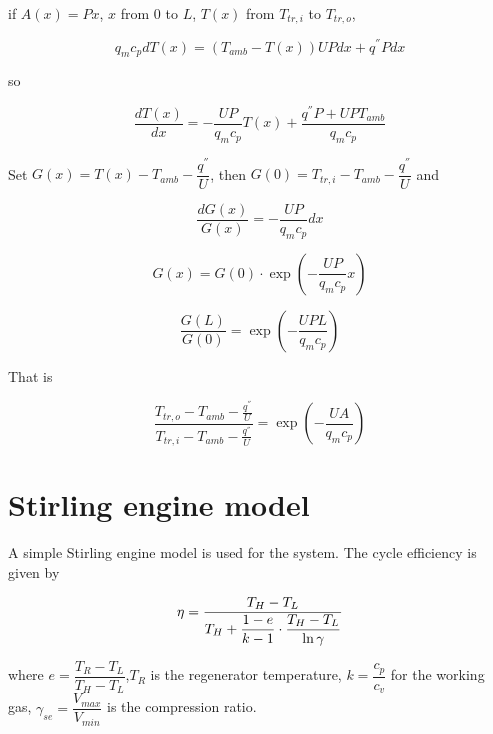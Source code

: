 \documentclass{article}
\begin{document}
if $A(x)=Px$, $x$ from $0$ to $L$, $T(x)$ from $T_{tr,i}$ to $T_{tr,o}$,

\begin{equation*}
	q_{m}c_{p}dT(x)=(T_{amb}-T(x))UPdx+q^{''}Pdx
\end{equation*}

so

\begin{equation*}
	\frac{dT(x)}{dx}=-\frac{UP}{q_{m}c_{p}}T(x)+\frac{q^{''}P+UPT_{amb}}{q_{m}c_{p}}
\end{equation*}

Set $G(x)=T(x)-T_{amb}-\dfrac{q^{''}}{U}$, then $G(0)=T_{tr,i}-T_{amb}-\dfrac{q^{''}}{U}$ and

\begin{equation*}
	\dfrac{dG(x)}{G(x)}=-\dfrac{UP}{q_{m}c_{p}}dx
\end{equation*}

\begin{equation*}
	G(x)=G(0)\cdot\exp(-\dfrac{UP}{q_{m}c_{p}}x)
\end{equation*}

\begin{equation*}
	\dfrac{G(L)}{G(0)}=\exp(-\dfrac{UPL}{q_{m}c_{p}})
\end{equation*}

That is

\begin{equation*}
	\frac{T_{tr,o}-T_{amb}-\frac{q^{''}}{U}}{T_{tr,i}-T_{amb}-\frac{q^{''}}{U}}=\exp(-\frac{UA}{q_{m}c_{p}})
\end{equation*}
\clearpage{}

\section{\noindent \label{sec:Stirling-engine-model}Stirling engine model}

A simple Stirling engine model is used for the system. The cycle efficiency is given by \cite{Stine1985}

\begin{equation}
	\eta=\frac{T_{H}-T_{L}}{T_{H}+\text{\ensuremath{\dfrac{1-e}{k-1}}}\cdot\dfrac{T_{H}-T_{L}}{\ln\gamma}}\label{eq:eta_stirling}
\end{equation}


where $e=\dfrac{T_{R}-T_{L}}{T_{H}-T_{L}}$,$T_{R}$ is the\emph{ }regenerator temperature, $k=\dfrac{c_{p}}{c_{v}}$ for the working gas, $\gamma_{se}=\dfrac{V_{max}}{V_{min}}$ is the compression ratio.
\end{document}

